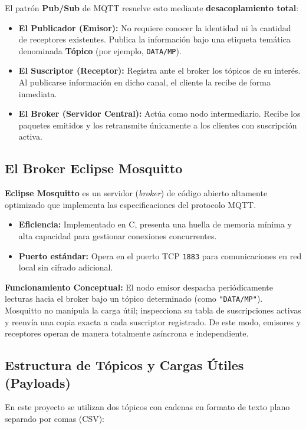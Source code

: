 \documentclass[12pt,letterpaper]{article}
\begin{document}
El patrón \textbf{Pub/Sub} de MQTT resuelve esto mediante \textbf{desacoplamiento total}:
\begin{itemize}
    \item \textbf{El Publicador (Emisor):} No requiere conocer la identidad ni la cantidad de receptores existentes. Publica la información bajo una etiqueta temática denominada \textbf{Tópico} (por ejemplo, \texttt{DATA/MP}).
    \item \textbf{El Suscriptor (Receptor):} Registra ante el broker los tópicos de su interés. Al publicarse información en dicho canal, el cliente la recibe de forma inmediata.
    \item \textbf{El Broker (Servidor Central):} Actúa como nodo intermediario. Recibe los paquetes emitidos y los retransmite únicamente a los clientes con suscripción activa.
\end{itemize}

\subsection{El Broker Eclipse Mosquitto}
\textbf{Eclipse Mosquitto} es un servidor (\textit{broker}) de código abierto altamente optimizado que implementa las especificaciones del protocolo MQTT. 
\begin{itemize}
    \item \textbf{Eficiencia:} Implementado en C, presenta una huella de memoria mínima y alta capacidad para gestionar conexiones concurrentes.
    \item \textbf{Puerto estándar:} Opera en el puerto TCP \texttt{1883} para comunicaciones en red local sin cifrado adicional.
\end{itemize}

\begin{tcolorbox}[estudiobox, title=Principio de Desacoplamiento en MQTT]
\textbf{Funcionamiento Conceptual:} El nodo emisor despacha periódicamente lecturas hacia el broker bajo un tópico determinado (como \texttt{"DATA/MP"}). Mosquitto no manipula la carga útil; inspecciona su tabla de suscripciones activas y reenvía una copia exacta a cada suscriptor registrado. De este modo, emisores y receptores operan de manera totalmente asíncrona e independiente.
\end{tcolorbox}

\subsection{Estructura de Tópicos y Cargas Útiles (Payloads)}
En este proyecto se utilizan dos tópicos con cadenas en formato de texto plano separado por comas (CSV):
\end{document}
